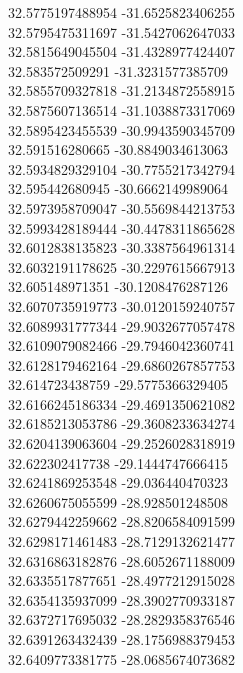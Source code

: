 {32.5775197488954	-31.6525823406255\\
32.5795475311697	-31.5427062647033\\
32.5815649045504	-31.4328977424407\\
32.583572509291	-31.3231577385709\\
32.5855709327818	-31.2134872558915\\
32.5875607136514	-31.1038873317069\\
32.5895423455539	-30.9943590345709\\
32.591516280665	-30.8849034613063\\
32.5934829329104	-30.7755217342794\\
32.595442680945	-30.6662149989064\\
32.5973958709047	-30.5569844213753\\
32.5993428189444	-30.4478311865628\\
32.6012838135823	-30.3387564961314\\
32.6032191178625	-30.2297615667913\\
32.605148971351	-30.1208476287126\\
32.6070735919773	-30.0120159240757\\
32.6089931777344	-29.9032677057478\\
32.6109079082466	-29.7946042360741\\
32.6128179462164	-29.6860267857753\\
32.614723438759	-29.5775366329405\\
32.6166245186334	-29.4691350621082\\
32.6185213053786	-29.3608233634274\\
32.6204139063604	-29.2526028318919\\
32.622302417738	-29.1444747666415\\
32.6241869253548	-29.036440470323\\
32.6260675055599	-28.928501248508\\
32.6279442259662	-28.8206584091599\\
32.6298171461483	-28.7129132621477\\
32.6316863182876	-28.6052671188009\\
32.6335517877651	-28.4977212915028\\
32.6354135937099	-28.3902770933187\\
32.6372717695032	-28.2829358376546\\
32.6391263432439	-28.1756988379453\\
32.6409773381775	-28.0685674073682\\
}
